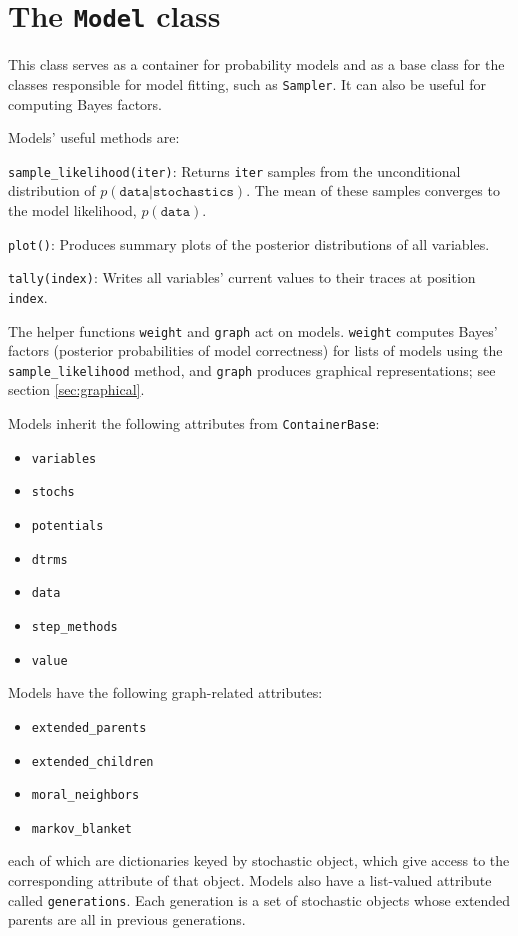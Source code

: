 \section{The \texttt{Model} class} \label{sec:Model}
This class serves as a container for probability models and as a base class for the classes responsible for model fitting, such as \texttt{Sampler}. It can also be useful for computing Bayes factors.

Models' useful methods are:
\begin{description}
    \item \texttt{sample_likelihood(iter)}: Returns \texttt{iter} samples from the unconditional distribution of $p(\mathtt{data} |\mathtt{stochastics})$. The mean of these samples converges to the model likelihood, $p(\mathtt{data})$.
    \item \texttt{plot()}: Produces summary plots of the posterior distributions of all variables.
    \item \texttt{tally(index)}: Writes all variables' current values to their traces at position \texttt{index}.
\end{description}

The helper functions \texttt{weight} and \texttt{graph} act on models. \texttt{weight} computes Bayes' factors (posterior probabilities of model correctness) for lists of models using the \texttt{sample_likelihood} method, and \texttt{graph} produces graphical representations; see section \ref{sec:graphical}.

Models inherit the following attributes from \texttt{ContainerBase}:
\begin{itemize}
    \item \texttt{variables}
    \item \texttt{stochs}
    \item \texttt{potentials}
    \item \texttt{dtrms}
    \item \texttt{data}
    \item \texttt{step_methods}
    \item \texttt{value}
\end{itemize}

Models have the following graph-related attributes:
\begin{itemize}
    \item \texttt{extended_parents}
    \item \texttt{extended_children}
    \item \texttt{moral_neighbors}
    \item \texttt{markov_blanket}
\end{itemize}
each of which are dictionaries keyed by stochastic object, which give access to the corresponding attribute of that object. Models also have a list-valued attribute called \texttt{generations}. Each generation is a set of stochastic objects whose extended parents are all in previous generations.

